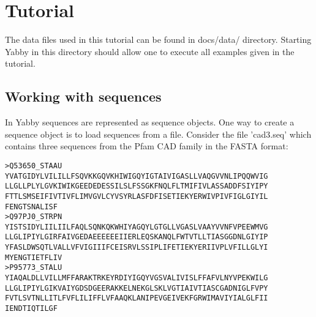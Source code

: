 

\setcounter{section}{0}

\chapter{Tutorial}

The data files used in this tutorial can be found in docs/data/ 
directory. Starting Yabby in this directory should allow one to
execute all examples given in the tutorial.

\section{Working with sequences}


In Yabby sequences are represented as sequence objects. One way
to create a sequence object is to load sequences from a file.
Consider the file 'cad3.seq' which contains three sequences
from the Pfam CAD family in the FASTA format:

\begin{verbatim}
>Q53650_STAAU
YVATGIDYLVILILLFSQVKKGQVKHIWIGQYIGTAIVIGASLLVAQGVVNLIPQQWVIG
LLGLLPLYLGVKIWIKGEEDEDESSILSLFSSGKFNQLFLTMIFIVLASSADDFSIYIPY
FTTLSMSEIFIVTIVFLIMVGVLCYVSYRLASFDFISETIEKYERWIVPIVFIGLGIYIL
FENGTSNALISF
>Q97PJ0_STRPN
YISTSIDYLIILIILFAQLSQNKQKWHIYAGQYLGTGLLVGASLVAAYVVNFVPEEWMVG
LLGLIPIYLGIRFAIVGEDAEEEEEEIIERLEQSKANQLFWTVTLLTIASGGDNLGIYIP
YFASLDWSQTLVALLVFVIGIIIFCEISRVLSSIPLIFETIEKYERIIVPLVFILLGLYI
MYENGTIETFLIV
>P95773_STALU
YIAQALDLLVILLMFFARAKTRKEYRDIYIGQYVGSVALIVISLFFAFVLNYVPEKWILG
LLGLIPIYLGIKVAIYGDSDGEERAKKELNEKGLSKLVGTIAIVTIASCGADNIGLFVPY
FVTLSVTNLLITLFVFLILIFFLVFAAQKLANIPEVGEIVEKFGRWIMAVIYIALGLFII
IENDTIQTILGF
\end{verbatim}

